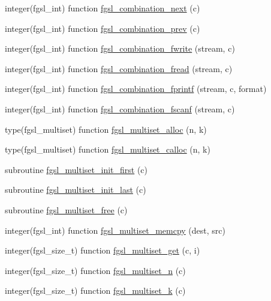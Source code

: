 \begin{DoxyCompactItemize}
\item 
integer(fgsl\-\_\-int) function \hyperlink{permutation_8finc_acf50f6a9728a138e3cbb1e014c047406}{fgsl\-\_\-combination\-\_\-next} (c)
\item 
integer(fgsl\-\_\-int) function \hyperlink{permutation_8finc_aee16ccc363b42c5bb4f5cda5cec21842}{fgsl\-\_\-combination\-\_\-prev} (c)
\item 
integer(fgsl\-\_\-int) function \hyperlink{permutation_8finc_a5c7269a8b592e3fd021ff35690d5c275}{fgsl\-\_\-combination\-\_\-fwrite} (stream, c)
\item 
integer(fgsl\-\_\-int) function \hyperlink{permutation_8finc_a40e24831c4b879f52d7923f0b3a8ea37}{fgsl\-\_\-combination\-\_\-fread} (stream, c)
\item 
integer(fgsl\-\_\-int) function \hyperlink{permutation_8finc_abf0711fb612be5f86dd06b31b26403b9}{fgsl\-\_\-combination\-\_\-fprintf} (stream, c, format)
\item 
integer(fgsl\-\_\-int) function \hyperlink{permutation_8finc_ad2dcdaa5e7550cdda2682f40367fba3a}{fgsl\-\_\-combination\-\_\-fscanf} (stream, c)
\item 
type(fgsl\-\_\-multiset) function \hyperlink{permutation_8finc_a7c55a19cb36e6d24c1937884a8d6c5b8}{fgsl\-\_\-multiset\-\_\-alloc} (n, k)
\item 
type(fgsl\-\_\-multiset) function \hyperlink{permutation_8finc_a9b60ad4de174107a2bb814fa946d2947}{fgsl\-\_\-multiset\-\_\-calloc} (n, k)
\item 
subroutine \hyperlink{permutation_8finc_ab2764f91fad296def839814aa48d405a}{fgsl\-\_\-multiset\-\_\-init\-\_\-first} (c)
\item 
subroutine \hyperlink{permutation_8finc_af11d68a8d9d59bc6b6a6ff371067a4c6}{fgsl\-\_\-multiset\-\_\-init\-\_\-last} (c)
\item 
subroutine \hyperlink{permutation_8finc_aecef1853cef964fa8dabf917628a2cf2}{fgsl\-\_\-multiset\-\_\-free} (c)
\item 
integer(fgsl\-\_\-int) function \hyperlink{permutation_8finc_a4ad5000e4797d1c096bc9c2b938bb3d8}{fgsl\-\_\-multiset\-\_\-memcpy} (dest, src)
\item 
integer(fgsl\-\_\-size\-\_\-t) function \hyperlink{permutation_8finc_a0d65011e4475e4b3b130e5c4e0dd7301}{fgsl\-\_\-multiset\-\_\-get} (c, i)
\item 
integer(fgsl\-\_\-size\-\_\-t) function \hyperlink{permutation_8finc_ab080e2383e519fc3bc3e1f8a09746867}{fgsl\-\_\-multiset\-\_\-n} (c)
\item 
integer(fgsl\-\_\-size\-\_\-t) function \hyperlink{permutation_8finc_a285143abab01c99704934281a8767baa}{fgsl\-\_\-multiset\-\_\-k} (c)

\end{DoxyCompactItemize}
